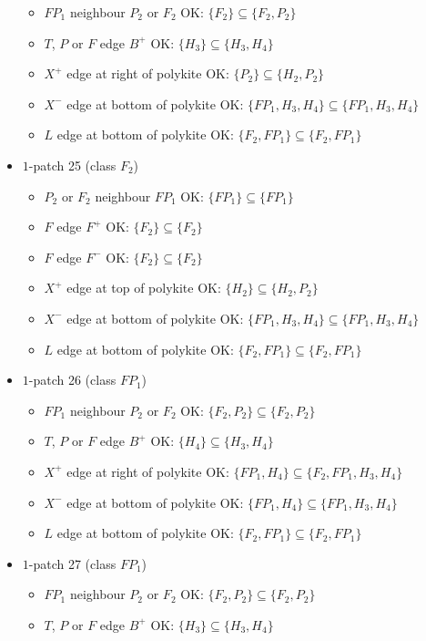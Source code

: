 \begin{itemize}
\begin{itemize}
\item $FP_1$ neighbour $P_2$ or $F_2$ OK: $\{F_2\} \subseteq \{F_2, P_2\}$
\item $T$, $P$ or $F$ edge $B^+$ OK: $\{H_3\} \subseteq \{H_3, H_4\}$
\item $X^+$ edge at right of polykite OK: $\{P_2\} \subseteq \{H_2, P_2\}$
\item $X^-$ edge at bottom of polykite OK: $\{FP_1, H_3, H_4\} \subseteq \{FP_1, H_3, H_4\}$
\item $L$ edge at bottom of polykite OK: $\{F_2, FP_1\} \subseteq \{F_2, FP_1\}$
\end{itemize}
\item $1$-patch 25 (class $F_2$)
\begin{itemize}
\item $P_2$ or $F_2$ neighbour $FP_1$ OK: $\{FP_1\} \subseteq \{FP_1\}$
\item $F$ edge $F^+$ OK: $\{F_2\} \subseteq \{F_2\}$
\item $F$ edge $F^-$ OK: $\{F_2\} \subseteq \{F_2\}$
\item $X^+$ edge at top of polykite OK: $\{H_2\} \subseteq \{H_2, P_2\}$
\item $X^-$ edge at bottom of polykite OK: $\{FP_1, H_3, H_4\} \subseteq \{FP_1, H_3, H_4\}$
\item $L$ edge at bottom of polykite OK: $\{F_2, FP_1\} \subseteq \{F_2, FP_1\}$
\end{itemize}
\item $1$-patch 26 (class $FP_1$)
\begin{itemize}
\item $FP_1$ neighbour $P_2$ or $F_2$ OK: $\{F_2, P_2\} \subseteq \{F_2, P_2\}$
\item $T$, $P$ or $F$ edge $B^+$ OK: $\{H_4\} \subseteq \{H_3, H_4\}$
\item $X^+$ edge at right of polykite OK: $\{FP_1, H_4\} \subseteq \{F_2, FP_1, H_3, H_4\}$
\item $X^-$ edge at bottom of polykite OK: $\{FP_1, H_4\} \subseteq \{FP_1, H_3, H_4\}$
\item $L$ edge at bottom of polykite OK: $\{F_2, FP_1\} \subseteq \{F_2, FP_1\}$
\end{itemize}
\item $1$-patch 27 (class $FP_1$)
\begin{itemize}
\item $FP_1$ neighbour $P_2$ or $F_2$ OK: $\{F_2, P_2\} \subseteq \{F_2, P_2\}$
\item $T$, $P$ or $F$ edge $B^+$ OK: $\{H_3\} \subseteq \{H_3, H_4\}$

\end{itemize}
\end{itemize}

